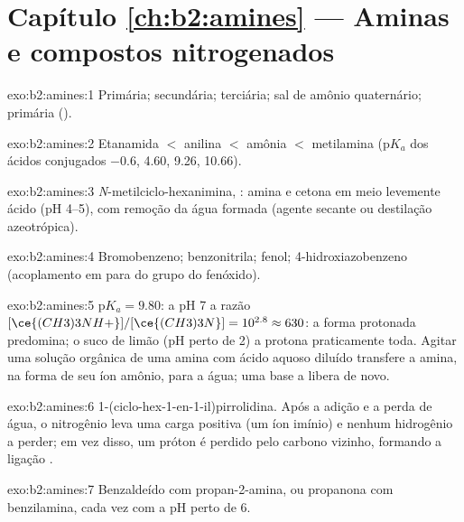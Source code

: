 \section*{Capítulo \ref{ch:b2:amines} --- Aminas e compostos nitrogenados}

\begin{solution}{exo:b2:amines:1}
Primária; secundária; terciária; sal de amônio quaternário; primária ().
\end{solution}

\begin{solution}{exo:b2:amines:2}
Etanamida $<$ anilina $<$ amônia $<$ metilamina ($\mathrm pK_a$ dos ácidos conjugados
$-0.6$, 4.60, 9.26, 10.66).
\end{solution}

\begin{solution}{exo:b2:amines:3}
\textit{N}-metilciclo-hexanimina, : amina e cetona em meio levemente ácido
(pH 4--5), com remoção da água formada (agente secante ou destilação azeotrópica).
\end{solution}

\begin{solution}{exo:b2:amines:4}
Bromobenzeno; benzonitrila; fenol; 4-hidroxiazobenzeno  (acoplamento em para do
grupo  do fenóxido).
\end{solution}

\begin{solution}{exo:b2:amines:5}
$\mathrm pK_a = 9.80$: a pH 7 a razão $[\ce{(CH3)3NH+}]/[\ce{(CH3)3N}] = 10^{2.8} \approx 630$: a
forma protonada predomina; o suco de limão (pH perto de 2) a protona praticamente toda. Agitar uma
solução orgânica de uma amina com ácido aquoso diluído transfere a amina, na forma de seu íon
amônio, para a água; uma base a libera de novo.
\end{solution}

\begin{solution}{exo:b2:amines:6}
1-(ciclo-hex-1-en-1-il)pirrolidina. Após a adição e a perda de água, o nitrogênio leva uma
carga positiva (um íon imínio) e nenhum hidrogênio a perder; em vez disso, um próton é perdido
pelo carbono vizinho, formando a ligação .
\end{solution}

\begin{solution}{exo:b2:amines:7}
Benzaldeído com propan-2-amina, ou propanona com benzilamina, cada vez com  a pH
perto de 6.
\end{solution}

